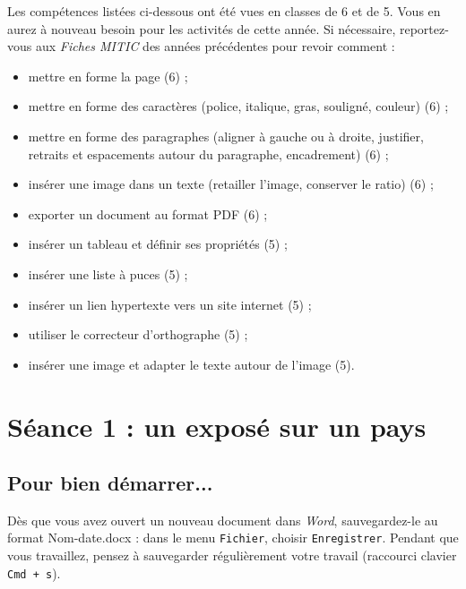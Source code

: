 Les compétences listées ci-dessous ont été vues en classes de 6 et de 5. Vous en aurez à nouveau besoin pour les activités de cette année. Si nécessaire, reportez-vous aux \emph{Fiches MITIC} des années précédentes pour revoir comment :  

\begin{itemize}
\item mettre en forme la page (6) ;
\item mettre en forme des caractères (police, italique, gras, souligné, couleur) (6) ;
\item mettre en forme des paragraphes (aligner à gauche ou à droite, justifier, retraits et espacements autour du paragraphe, encadrement) (6) ;
\item insérer une image dans un texte (retailler l'image, conserver le ratio) (6) ;
\item exporter un document au format PDF (6) ;
\item insérer un tableau et définir ses propriétés (5) ;
\item insérer une liste à puces (5) ;
\item insérer un lien hypertexte vers un site internet (5) ;
\item utiliser le correcteur d'orthographe (5) ;
\item insérer une image et adapter le texte autour de l'image (5).
\end{itemize}






%
%
%
%

\pagebreak

\section{Séance 1 : un exposé sur un pays}\label{ficheTexte4e2}


\subsection{Pour bien démarrer...}

Dès que vous avez ouvert un nouveau document dans \emph{Word}, sauvegardez-le au format Nom-date.docx : dans le menu \texttt{Fichier}, choisir \texttt{Enregistrer}. Pendant que vous travaillez, pensez à sauvegarder régulièrement votre travail (raccourci clavier \texttt{Cmd + s}).   

